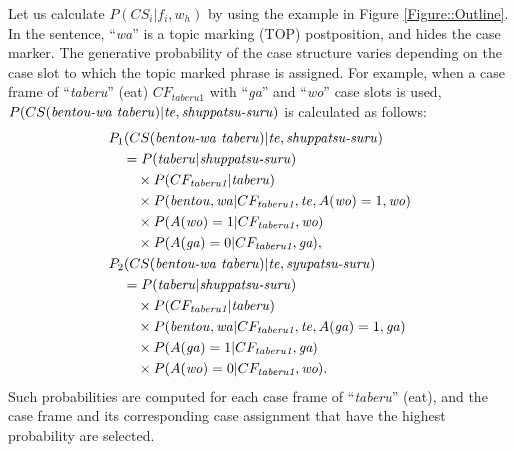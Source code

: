 \documentclass[english]{jnlp_1.4_rep}
\begin{document}
Let us calculate $P(CS_i|f_i,w_h)$ by using the example in Figure
\ref{Figure::Outline}. In the sentence, ``\textit{wa}'' is a topic
marking (\textsf{TOP}) postposition, and hides the case marker. The
generative probability of the case structure varies depending on the case
slot to which the topic marked phrase is assigned. For example, when a
case frame of ``\textit{taberu}'' (eat) $CF_{\textit{taberu1}}$ with
``\textit{ga}'' and ``\textit{wo}'' case slots is used,
$P(CS(\mbox{\textit{bentou-wa
taberu}})|\mbox{\textit{te}},\mbox{\textit{shuppatsu-suru}})$ is
calculated as follows:
{\allowdisplaybreaks
\begin{align}
  & P_{1}(CS(\mbox{\textit{bentou-wa} \textit{taberu}})|\mbox{\textit{te}},\mbox{\textit{shuppatsu-suru}}) \nonumber\\
  & \quad = P(\mathrm{\mbox{\textit{taberu}}}|\mathrm{\mbox{\textit{shuppatsu-suru}}}) \nonumber\\
  & \qquad \times P(CF_{\textit{taberu1}}|\mathrm{\mbox{\textit{taberu}}}) \nonumber\\
  & \qquad \times P(\mathrm{\mbox{\textit{bentou}}}, \mathrm{\mbox{\textit{wa}}}|CF_{\textit{taberu1}},\mathrm{\mbox{\textit{te}}},A(\mathrm{\mbox{\textit{wo}}})=1,\mbox{\textit{wo}}) \nonumber\\
  & \qquad \times P(A(\mathrm{\mbox{\textit{wo}}})=1|CF_{\textit{taberu1}}, \textit{wo}) \nonumber\\
  & \qquad \times P(A(\mathrm{\mbox{\textit{ga}}})=0|CF_{\textit{taberu1}}, \textit{ga}), \\
 & P_{2}(CS(\mbox{\textit{bentou-wa} \textit{taberu}})|\mbox{\textit{te}},\mbox{\textit{syupatsu-suru}}) \nonumber\\
 & \quad = P(\mathrm{\mbox{\textit{taberu}}}|\mathrm{\mbox{\textit{shuppatsu-suru}}}) \nonumber\\
 & \qquad \times P(CF_{\textit{taberu1}}|\mathrm{\mbox{\textit{taberu}}}) \nonumber\\
 & \qquad \times P(\mathrm{\mbox{\textit{bentou}}}, \mathrm{\mbox{\textit{wa}}}|CF_{\textit{taberu1}},\mathrm{\mbox{\textit{te}}},A(\mathrm{\mbox{\textit{ga}}})=1,\mbox{\textit{ga}}) \nonumber\\
 & \qquad \times P(A(\mathrm{\mbox{\textit{ga}}})=1|CF_{\textit{taberu1}}, \textit{ga}) \nonumber\\
 & \qquad \times P(A(\mathrm{\mbox{\textit{wo}}})=0|CF_{\textit{taberu1}}, \textit{wo}).
\end{align}
}
Such probabilities are computed for each case frame of
``\textit{taberu}'' (eat), and the case frame and its corresponding case
assignment that have the highest probability are selected.
\end{document}
